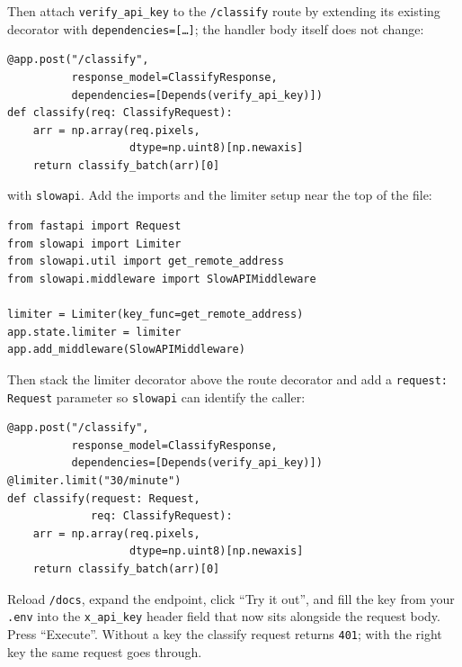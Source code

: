 Then attach \texttt{verify\_api\_key} to the \texttt{/classify} route by
extending its existing decorator with \texttt{dependencies=[\dots]}; the
handler body itself does not change:

\begin{verbatim}
@app.post("/classify",
          response_model=ClassifyResponse,
          dependencies=[Depends(verify_api_key)])
def classify(req: ClassifyRequest):
    arr = np.array(req.pixels,
                   dtype=np.uint8)[np.newaxis]
    return classify_batch(arr)[0]
\end{verbatim}


 with \texttt{slowapi}. Add the imports
and the limiter setup near the top of the file:

\begin{verbatim}
from fastapi import Request
from slowapi import Limiter
from slowapi.util import get_remote_address
from slowapi.middleware import SlowAPIMiddleware

limiter = Limiter(key_func=get_remote_address)
app.state.limiter = limiter
app.add_middleware(SlowAPIMiddleware)
\end{verbatim}

Then stack the limiter decorator above the route decorator and add a
\texttt{request: Request} parameter so \texttt{slowapi} can identify the
caller:

\begin{verbatim}
@app.post("/classify",
          response_model=ClassifyResponse,
          dependencies=[Depends(verify_api_key)])
@limiter.limit("30/minute")
def classify(request: Request,
             req: ClassifyRequest):
    arr = np.array(req.pixels,
                   dtype=np.uint8)[np.newaxis]
    return classify_batch(arr)[0]
\end{verbatim}

Reload \texttt{/docs}, expand the endpoint, click ``Try it out'', and
fill the key from your \texttt{.env} into the \texttt{x\_api\_key}
header field that now sits alongside the request body. Press
``Execute''. Without a key the classify request returns \texttt{401};
with the right key the same request goes through.

